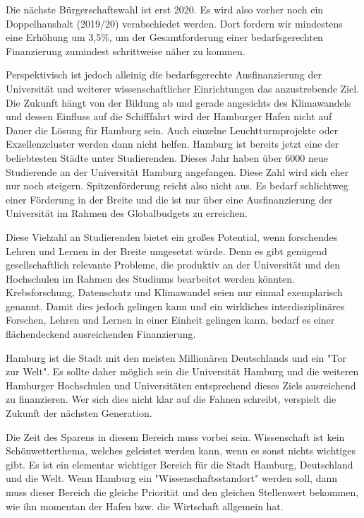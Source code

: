 \documentclass[ngerman,headheight=70pt]{scrartcl}
\begin{document}
    Die nächste Bürgerschaftswahl ist erst 2020. Es wird also vorher noch ein
    Doppelhaushalt (2019/20) verabschiedet werden. Dort fordern wir mindestens
    eine Erhöhung um 3,5\%, um der Gesamtforderung einer bedarfsgerechten
    Finanzierung zumindest schrittweise näher zu kommen.

    Perspektivisch ist jedoch alleinig die bedarfsgerechte Ausfinanzierung der
    Universität und weiterer wissenschaftlicher Einrichtungen das anzustrebende
    Ziel. Die Zukunft hängt von der Bildung ab und gerade angesichts des
    Klimawandels und dessen Einfluss auf die Schifffahrt wird der Hamburger
    Hafen nicht auf Dauer die Lösung für Hamburg sein. Auch einzelne
    Leuchtturmprojekte oder Exzellenzcluster werden dann nicht helfen.
    Hamburg ist bereits jetzt eine der beliebtesten Städte unter Studierenden.
    Dieses Jahr haben über 6000 neue Studierende an der Universität Hamburg
    angefangen. Diese Zahl wird sich eher nur noch steigern. Spitzenförderung
    reicht also nicht aus. Es bedarf schlichtweg einer Förderung in der Breite
    und die ist nur über eine Ausfinanzierung der Universität im Rahmen des
    Globalbudgets zu erreichen.

    Diese Vielzahl an Studierenden bietet ein großes Potential, wenn forschendes
    Lehren und Lernen in der Breite umgesetzt würde. Denn es gibt genügend
    gesellschaftlich relevante Probleme, die produktiv an der Universität und
    den Hochschulen im Rahmen des Studiums bearbeitet werden könnten.
    Krebsforschung, Datenschutz und Klimawandel seien nur einmal exemplarisch
    genannt. Damit dies jedoch gelingen kann und ein wirkliches interdisziplinäres
    Forschen, Lehren und Lernen in einer Einheit gelingen kann, bedarf es einer
    flächendeckend ausreichenden Finanzierung.

    Hamburg ist die Stadt mit den meisten Millionären Deutschlands und ein "Tor
    zur Welt". Es sollte daher möglich sein die Universität Hamburg und die
    weiteren Hamburger Hochschulen und Universitäten entsprechend dieses Ziels
    ausreichend zu finanzieren. Wer sich dies nicht klar auf die Fahnen schreibt,
    verspielt die Zukunft der nächsten Generation.

    Die Zeit des Sparens in diesem Bereich muss vorbei sein. Wissenschaft ist
    kein Schönwetterthema, welches geleistet werden kann, wenn es sonst nichts
    wichtiges gibt. Es ist ein elementar wichtiger Bereich für die Stadt Hamburg,
    Deutschland und die Welt. Wenn Hamburg ein "Wissenschaftsstandort" werden
    soll, dann muss dieser Bereich die gleiche Priorität und den gleichen
    Stellenwert bekommen, wie ihn momentan der Hafen bzw. die Wirtschaft
    allgemein hat.
\end{document}
